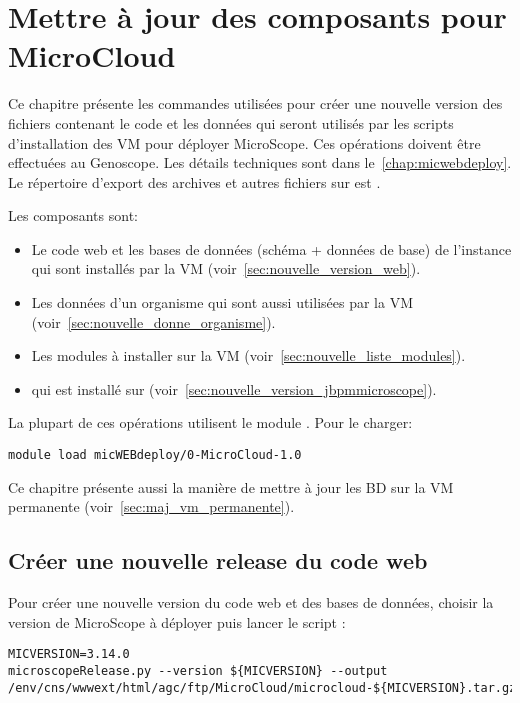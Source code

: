 \chapter{Mettre à jour des composants pour MicroCloud} \label{chap:creer_nouvelle_version}

Ce chapitre présente les commandes utilisées pour créer une nouvelle version
des fichiers contenant le code et les données qui seront utilisés
par les scripts d'installation des VM pour déployer MicroScope.
Ces opérations doivent être effectuées au Genoscope.
Les détails techniques sont dans le~\autoref{chap:micwebdeploy}.
Le répertoire d'export des archives et autres fichiers sur  est .

Les composants sont:
\begin{itemize}
    \item Le code web et les bases de données (schéma + données de base) de l'instance
          qui sont installés par la VM   (voir~\autoref{sec:nouvelle_version_web}).
    \item Les données d'un organisme qui sont aussi utilisées par la VM   (voir~\autoref{sec:nouvelle_donne_organisme}).
    \item Les modules à installer sur la VM  (voir~\autoref{sec:nouvelle_liste_modules}).
    \item {} qui est installé sur  (voir~\autoref{sec:nouvelle_version_jbpmmicroscope}).
\end{itemize}

La plupart de ces opérations utilisent le module \micWEBdeployVer.
Pour le charger:
\begin{lstlisting}[style=bash]
module load micWEBdeploy/0-MicroCloud-1.0
\end{lstlisting}

Ce chapitre présente aussi la manière de mettre à jour les BD sur la VM permanente (voir~\autoref{sec:maj_vm_permanente}).

\section{Créer une nouvelle release du code web} \label{sec:nouvelle_version_web}

Pour créer une nouvelle version du code web et des bases de données, choisir la version de MicroScope à déployer puis lancer le script  :
\begin{lstlisting}[style=bash]
MICVERSION=3.14.0
microscopeRelease.py --version ${MICVERSION} --output /env/cns/wwwext/html/agc/ftp/MicroCloud/microcloud-${MICVERSION}.tar.gz
\end{lstlisting}

